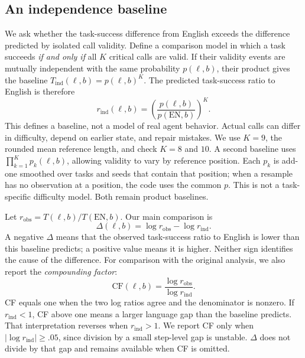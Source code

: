\documentclass[11pt]{article}
\begin{document}
\subsection{An independence baseline}
We ask whether the task-success difference from English exceeds the
difference predicted by isolated call validity. Define a comparison model
in which a task succeeds \emph{if and only if} all $K$ critical calls are
valid. If their validity events are mutually independent with the same
probability $p(\ell,b)$, their product gives the baseline
$T_{\mathrm{ind}}(\ell,b)=p(\ell,b)^K$. The predicted task-success ratio to English is therefore
\begin{equation}
r_{\mathrm{ind}}(\ell,b)
=\left(\frac{p(\ell,b)}{p(\mathrm{EN},b)}\right)^K.
\label{eq:indep}
\end{equation}
This defines a baseline, not a model of real agent behavior. Actual calls
can differ in difficulty, depend on earlier state, and repair mistakes.
We use $K=9$, the rounded mean reference length, and check $K=8$ and $10$.
A second baseline uses $\prod_{k=1}^K p_k(\ell,b)$, allowing validity to
vary by reference position. Each $p_k$ is add-one smoothed over tasks and
seeds that contain that
position; when a resample has no observation at a position, the code uses
the common $p$. This is not a task-specific difficulty model. Both remain
product baselines.

Let $r_{\mathrm{obs}}=T(\ell,b)/T(\mathrm{EN},b)$. Our main comparison is
\begin{equation}
\Delta(\ell,b)=\log r_{\mathrm{obs}}-\log r_{\mathrm{ind}}.
\label{eq:delta}
\end{equation}
A negative $\Delta$ means that the observed task-success ratio to English
is lower than this baseline predicts; a positive value means it is higher.
Neither sign identifies the cause of the difference.
For comparison with the original analysis, we also report the
\emph{compounding factor}:
\begin{equation}
\mathrm{CF}(\ell,b)=\frac{\log r_{\mathrm{obs}}}{\log r_{\mathrm{ind}}}.
\label{eq:cf}
\end{equation}
CF equals one when the two log ratios agree and the denominator is nonzero.
If $r_{\mathrm{ind}}<1$,
CF above one means a larger language gap than the baseline predicts.
That interpretation reverses when $r_{\mathrm{ind}}>1$.
We report CF only when $|\log r_{\mathrm{ind}}|\geq .05$, since division
by a small step-level gap is unstable. $\Delta$ does not divide by that
gap and remains available when CF is omitted.
\end{document}
